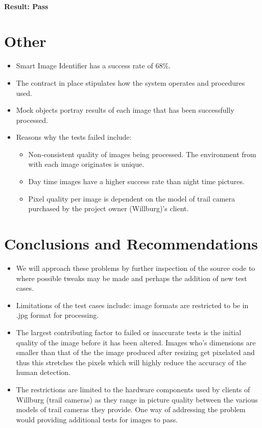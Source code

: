 \documentclass[a4paper,12pt]{report}
\begin{document}
		\paragraph{Result: Pass}
		
	\section{Other}
		\begin {itemize}
			\item Smart Image Identifier has a success rate of 68\%.
			\item The contract in place stipulates how the system operates and procedures used. 
			\item Mock objects portray results of each image that has been successfully processed.
			\item Reasons why the tests failed include:
			\begin{itemize}
				\item Non-consistent quality of images being processed. The environment from with each image originates is unique.
				\item Day time images have a higher success rate than night time pictures.
				\item Pixel quality per image is dependent on the model of trail camera purchased by the project owner (Willburg)'s client.
			\end{itemize}
		\end {itemize}
\newpage		
	\section{Conclusions and Recommendations}
		\begin {itemize}
			\item We will approach these problems by further inspection of the source code to where possible tweaks may be made and perhaps the addition of new test cases.
			\item Limitations of the test cases include: image formats are restricted to be in .jpg format for processing.
			\item The largest contributing factor to failed or inaccurate tests is the initial quality of the image before it has been altered. Images who's dimensions are smaller than that of the the image produced after resizing get pixelated and thus this stretches the pixels which will highly reduce the accuracy of the human detection.			
			\item The restrictions are limited to the hardware components used by clients of Willburg (trail cameras) as they range in picture quality between the various models of trail cameras they provide. One way of addressing the problem would providing additional tests for images to pass.
		\end {itemize}
\end{document}
